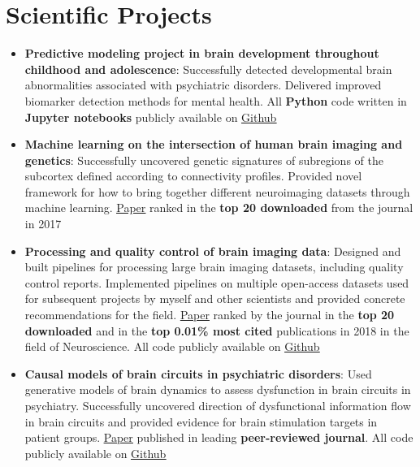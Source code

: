 \documentclass[letterpaper,10pt]{article}
\newcommand{\resumeItem}[2]{
  \item\small{
    \textbf{#1}{: #2 \vspace{-2pt}}
  }
}
\newcommand{\resumeSubItem}[2]{\resumeItem{#1}{#2}\vspace{-4pt}}
\newcommand{\resumeSubHeadingListStart}{\begin{itemize}[leftmargin=*]}
\newcommand{\resumeSubHeadingListEnd}{\end{itemize}}
\begin{document}
\section{Scientific Projects}
  \resumeSubHeadingListStart
    \resumeSubItem{Predictive modeling project in brain development throughout childhood and adolescence}
      {Successfully detected developmental brain abnormalities associated with psychiatric disorders. Delivered improved biomarker detection methods for mental health. All \textbf{Python} code written in \textbf{Jupyter notebooks} publicly available on \href{https://github.com/lindenmp/NormativeNeuroDev_CrossSec}{\underline{Github}}}
      \newline
    \resumeSubItem{Machine learning on the intersection of human brain imaging and genetics}
      {Successfully uncovered genetic signatures of subregions of the subcortex defined according to connectivity profiles. Provided novel framework for how to bring together different neuroimaging datasets through machine learning. \href{https://onlinelibrary.wiley.com/doi/full/10.1111/gbb.12386}{\underline{Paper}} ranked in the \textbf{top 20 downloaded} from the journal in 2017}
      \newline
    \resumeSubItem{Processing and quality control of brain imaging data}
      {Designed and built pipelines for processing large brain imaging datasets, including quality control reports. Implemented pipelines on multiple open-access datasets used for subsequent projects by myself and other scientists and provided concrete recommendations for the field. \href{https://www.sciencedirect.com/science/article/pii/S1053811917310972}{\underline{Paper}} ranked by the journal in the \textbf{top 20 downloaded} and in the \textbf{top 0.01\% most cited} publications in 2018 in the field of Neuroscience. All code publicly available on \href{https://github.com/lindenmp/rs-fMRI}{\underline{Github}}}
      \newline
    \resumeSubItem{Causal models of brain circuits in psychiatric disorders}
      {Used generative models of brain dynamics to assess dysfunction in brain circuits in psychiatry. Successfully uncovered direction of dysfunctional information flow in brain circuits and provided evidence for brain stimulation targets in patient groups. \href{https://www.sciencedirect.com/science/article/pii/S1053811919306585}{\underline{Paper}} published in leading \textbf{peer-reviewed journal}. All code publicly available on \href{https://github.com/lindenmp/rs-fMRI/tree/master/stats/spDCM}{\underline{Github}}}
  \resumeSubHeadingListEnd
\end{document}
